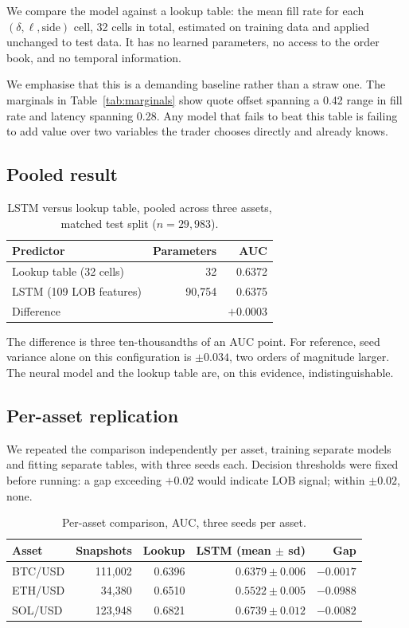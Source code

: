 \documentclass[11pt]{article}
\begin{document}
We compare the model against a lookup table: the mean fill rate for each
$(\delta, \ell, \text{side})$ cell, 32 cells in total, estimated on training
data and applied unchanged to test data. It has no learned parameters, no access
to the order book, and no temporal information.

We emphasise that this is a demanding baseline rather than a straw one. The
marginals in Table~\ref{tab:marginals} show quote offset spanning a 0.42 range
in fill rate and latency spanning 0.28. Any model that fails to beat this table
is failing to add value over two variables the trader chooses directly and
already knows.

\subsection{Pooled result}

\begin{table}[h]
\centering
\caption{LSTM versus lookup table, pooled across three assets, matched test
split ($n = 29{,}983$).}
\label{tab:baseline}
\begin{tabular}{lrr}
\toprule
Predictor & Parameters & AUC \\
\midrule
Lookup table (32 cells) & 32 & 0.6372 \\
LSTM (109 LOB features) & 90{,}754 & 0.6375 \\
\midrule
Difference & & $+0.0003$ \\
\bottomrule
\end{tabular}
\end{table}

\noindent
The difference is three ten-thousandths of an AUC point. For reference, seed
variance alone on this configuration is $\pm 0.034$, two orders of magnitude
larger. The neural model and the lookup table are, on this evidence,
indistinguishable.

\subsection{Per-asset replication}
\label{sec:perasset}

We repeated the comparison independently per asset, training separate models and
fitting separate tables, with three seeds each. Decision thresholds were fixed
before running: a gap exceeding $+0.02$ would indicate LOB signal; within
$\pm 0.02$, none.

\begin{table}[h]
\centering
\caption{Per-asset comparison, AUC, three seeds per asset.}
\label{tab:perasset}
\begin{tabular}{lrrrr}
\toprule
Asset & Snapshots & Lookup & LSTM (mean $\pm$ sd) & Gap \\
\midrule
BTC/USD & 111{,}002 & 0.6396 & $0.6379 \pm 0.006$ & $-0.0017$ \\
ETH/USD &  34{,}380 & 0.6510 & $0.5522 \pm 0.005$ & $-0.0988$ \\
SOL/USD & 123{,}948 & 0.6821 & $0.6739 \pm 0.012$ & $-0.0082$ \\
\bottomrule
\end{tabular}
\end{table}
\end{document}
